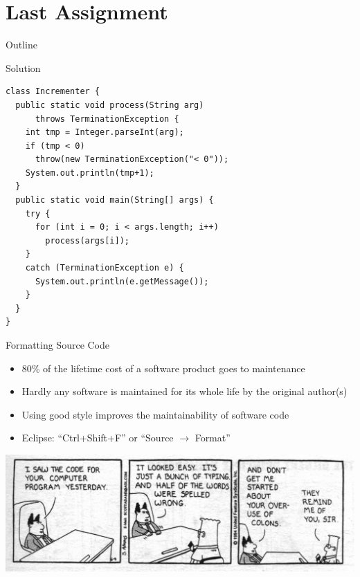 \section{Last Assignment}

\begin{frame}{Outline}
  \tableofcontents[current]
\end{frame}

\begin{frame}[fragile]{Solution}
  \begin{lstlisting}[basicstyle=\ttfamily\small]
class Incrementer {
  public static void process(String arg) 
      throws TerminationException {
    int tmp = Integer.parseInt(arg);
    if (tmp < 0)
      throw(new TerminationException("< 0"));
    System.out.println(tmp+1);    
  }  
  public static void main(String[] args) {
    try {
      for (int i = 0; i < args.length; i++)
        process(args[i]);
    }
    catch (TerminationException e) {
      System.out.println(e.getMessage()); 
    } 
  }
} 
  \end{lstlisting}
\end{frame}

\begin{frame}{Formatting Source Code}
  \begin{itemize}
  \item 80\% of the lifetime cost of a software product goes to
    maintenance
  \item Hardly any software is maintained for its whole life by the
    original author(s)
  \item Using good style improves the maintainability of software
    code
  \item Eclipse: ``Ctrl+Shift+F'' or ``Source $\rightarrow$ Format''
  \end{itemize}


  \begin{center}
    \includegraphics[scale=0.3]{figures/dilbert-2}    
  \end{center}
\end{frame}

